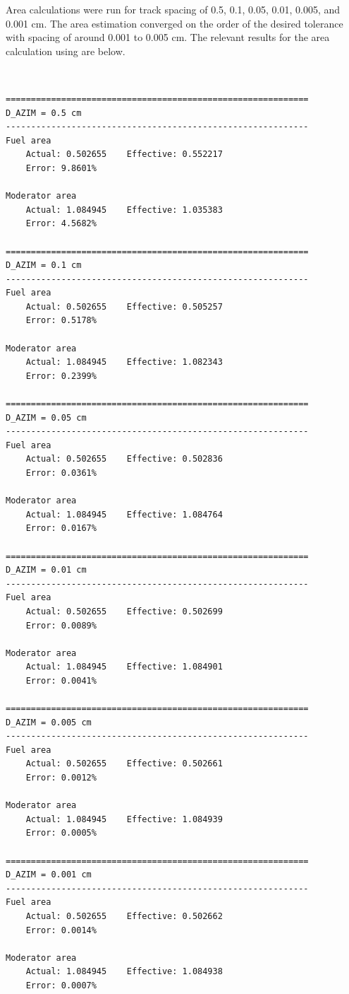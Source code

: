 \documentclass[12pt]{article}
\begin{document}
Area calculations were run for track spacing of 0.5, 0.1, 0.05, 0.01, 0.005, and 0.001 cm. The area estimation converged on the order of the desired tolerance with spacing of around 0.001 to 0.005 cm. The relevant results for the area calculation using are below.

$ $

\begin{verbatim}
============================================================
D_AZIM = 0.5 cm
------------------------------------------------------------
Fuel area
    Actual: 0.502655    Effective: 0.552217
    Error: 9.8601%

Moderator area
    Actual: 1.084945    Effective: 1.035383
    Error: 4.5682%

============================================================
D_AZIM = 0.1 cm
------------------------------------------------------------
Fuel area
    Actual: 0.502655    Effective: 0.505257
    Error: 0.5178%

Moderator area
    Actual: 1.084945    Effective: 1.082343
    Error: 0.2399%

============================================================
D_AZIM = 0.05 cm
------------------------------------------------------------
Fuel area
    Actual: 0.502655    Effective: 0.502836
    Error: 0.0361%

Moderator area
    Actual: 1.084945    Effective: 1.084764
    Error: 0.0167%

============================================================
D_AZIM = 0.01 cm
------------------------------------------------------------
Fuel area
    Actual: 0.502655    Effective: 0.502699
    Error: 0.0089%

Moderator area
    Actual: 1.084945    Effective: 1.084901
    Error: 0.0041%

============================================================
D_AZIM = 0.005 cm
------------------------------------------------------------
Fuel area
    Actual: 0.502655    Effective: 0.502661
    Error: 0.0012%

Moderator area
    Actual: 1.084945    Effective: 1.084939
    Error: 0.0005%

============================================================
D_AZIM = 0.001 cm
------------------------------------------------------------
Fuel area
    Actual: 0.502655    Effective: 0.502662
    Error: 0.0014%

Moderator area
    Actual: 1.084945    Effective: 1.084938
    Error: 0.0007%
\end{verbatim}
\end{document}
